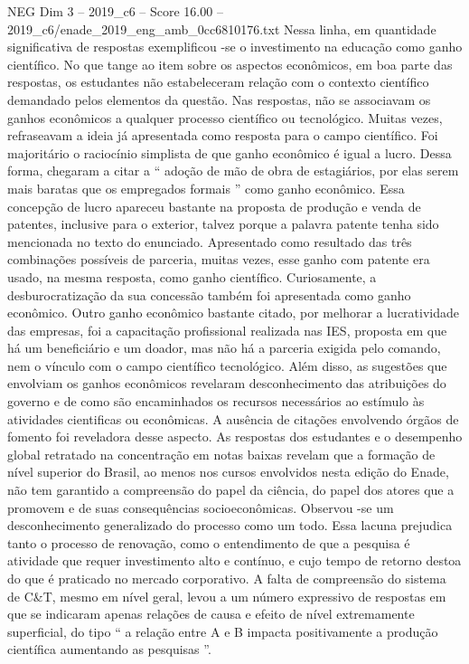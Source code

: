 \begin{textsample}{NEG Dim 3 – 2019\_c6 – Score 16.00 – 2019\_c6/enade\_2019\_eng\_amb\_0cc6810176.txt}
Nessa linha, em quantidade significativa de respostas exemplificou -se o investimento na educação como ganho científico.
No que tange ao item sobre os aspectos econômicos, em boa parte das respostas, os estudantes não estabeleceram relação com o contexto científico demandado pelos elementos da questão.
Nas respostas, não se associavam os ganhos econômicos a qualquer processo científico ou tecnológico.
Muitas vezes, refraseavam a ideia já apresentada como resposta para o campo científico.
Foi majoritário o raciocínio simplista de que ganho econômico é igual a lucro.
Dessa forma, chegaram a citar a “ adoção de mão de obra de estagiários, por elas serem mais baratas que os empregados formais ” como ganho econômico.
Essa concepção de lucro apareceu bastante na proposta de produção e venda de patentes, inclusive para o exterior, talvez porque a palavra patente tenha sido mencionada no texto do enunciado.
Apresentado como resultado das três combinações possíveis de parceria, muitas vezes, esse ganho com patente era usado, na mesma resposta, como ganho científico.
Curiosamente, a desburocratização da sua concessão também foi apresentada como ganho econômico.
Outro ganho econômico bastante citado, por melhorar a lucratividade das empresas, foi a capacitação profissional realizada nas IES, proposta em que há um beneficiário e um doador, mas não há a parceria exigida pelo comando, nem o vínculo com o campo científico tecnológico.
Além disso, as sugestões que envolviam os ganhos econômicos revelaram desconhecimento das atribuições do governo e de como são encaminhados os recursos necessários ao estímulo às atividades cientificas ou econômicas.
A ausência de citações envolvendo órgãos de fomento foi reveladora desse aspecto.
As respostas dos estudantes e o desempenho global retratado na concentração em notas baixas revelam que a formação de nível superior do Brasil, ao menos nos cursos envolvidos nesta edição do Enade, não tem garantido a compreensão do papel da ciência, do papel dos atores que a promovem e de suas consequências socioeconômicas.
Observou -se um desconhecimento generalizado do processo como um todo.
Essa lacuna prejudica tanto o processo de renovação, como o entendimento de que a pesquisa é atividade que requer investimento alto e contínuo, e cujo tempo de retorno destoa do que é praticado no mercado corporativo.
A falta de compreensão do sistema de C\&T, mesmo em nível geral, levou a um número expressivo de respostas em que se indicaram apenas relações de causa e efeito de nível extremamente superficial, do tipo “ a relação entre A e B impacta positivamente a produção científica aumentando as pesquisas ”.

\end{textsample}
